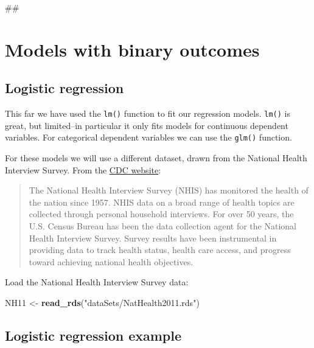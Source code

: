 \documentclass[]{book}
\newenvironment{Shaded}{\begin{snugshade}}{\end{snugshade}}
\newcommand{\KeywordTok}[1]{\textcolor[rgb]{0.13,0.29,0.53}{\textbf{#1}}}
\newcommand{\StringTok}[1]{\textcolor[rgb]{0.31,0.60,0.02}{#1}}
\newcommand{\NormalTok}[1]{#1}
\begin{document}
\begin{Shaded}
\begin{Highlighting}[]
\NormalTok{## }
\end{Highlighting}
\end{Shaded}

\section{Models with binary outcomes}\label{models-with-binary-outcomes}

\subsection{Logistic regression}\label{logistic-regression}

This far we have used the \texttt{lm()} function to fit our regression
models. \texttt{lm()} is great, but limited--in particular it only fits
models for continuous dependent variables. For categorical dependent
variables we can use the \texttt{glm()} function.

For these models we will use a different dataset, drawn from the
National Health Interview Survey. From the
\href{http://www.cdc.gov/nchs/nhis.htm}{CDC website}:

\begin{quote}
The National Health Interview Survey (NHIS) has monitored the health of
the nation since 1957. NHIS data on a broad range of health topics are
collected through personal household interviews. For over 50 years, the
U.S. Census Bureau has been the data collection agent for the National
Health Interview Survey. Survey results have been instrumental in
providing data to track health status, health care access, and progress
toward achieving national health objectives.
\end{quote}

Load the National Health Interview Survey data:

\begin{Shaded}
\begin{Highlighting}[]
\NormalTok{  NH11 <-}\StringTok{ }\KeywordTok{read_rds}\NormalTok{(}\StringTok{"dataSets/NatHealth2011.rds"}\NormalTok{)}
\end{Highlighting}
\end{Shaded}

\subsection{Logistic regression
example}\label{logistic-regression-example}
\end{document}
